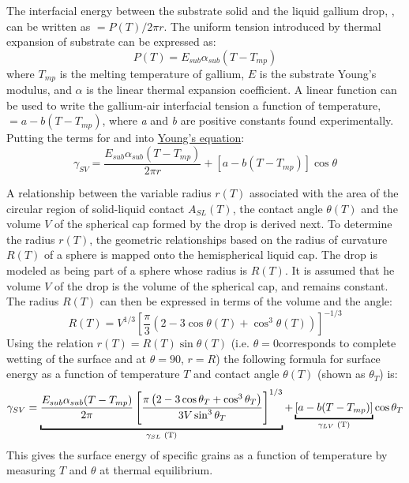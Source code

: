 The interfacial energy between the substrate solid and the liquid gallium drop, \gamSL, can be written as \gamSL$=P(T)/2\pi r$. The uniform tension introduced by thermal expansion of substrate can be expressed as:
\begin{equation}\label{uniform-tension}
	P(T) = E_{sub}\alpha_{sub}(T-T_{mp})
\end{equation}
where $T_{mp}$ is the melting temperature of gallium, $E$  is the substrate Young’s modulus, and $\alpha$ is the linear thermal expansion coefficient. A linear function can be used to write the gallium-air interfacial tension a function of temperature, \gamLV $= a-b(T-T_{mp})$, where \textit{a} and \textit{b} are positive constants found experimentally.\cite{Hardy1985,Alchagirov2005} Putting the terms for \gamSL and \gamSV into \hyperlink{youngeqn}{Young’s equation}\cite{Rudawska2009,Tadmor2004}:
\begin{equation*}%
	\gamma_{SV} =  \frac{E_{sub}\alpha_{sub}(T-T_{mp})}{2\pi r} + \left[a-b(T-T_{mp})\right]\cos\theta
\end{equation*}


A relationship between the variable radius $r(T)$ associated with the area of the circular region of solid-liquid contact $A_{SL}(T)$, the contact angle $\theta(T)$ and the volume $V$ of the spherical cap formed by the drop is derived next. To determine the radius $r(T)$, the geometric relationships based on the radius of curvature $R(T)$ of a sphere is mapped onto the hemispherical liquid cap. The drop is modeled as being part of a sphere whose radius is $R(T)$. It is assumed that he volume $V$ of the drop is the volume of the spherical cap, and remains constant. The radius $R(T)$ can then be expressed in terms of the volume and the angle:
\begin{equation*}\label{drop-geom}
	R(T) = V^{1/3} \left[\frac{\pi}{3} \left(2-3\cos\theta(T)+\cos^{3}\theta(T)\right)\right]^{-1/3}
\end{equation*}
Using the relation $r(T)=R(T)\sin\theta(T)$ (i.e. $\theta=$0\degree corresponds to complete wetting of the surface and at $\theta=90$\degree,  $r=R$) the following formula for surface energy as a function of temperature $T$ and contact angle $\theta(T)$ (shown as $\theta_{T}$) is:
\begin{equation}\label{youngs-eqn-ga}
	\gamma_{SV} =  \underbracket{\frac{E_{sub}\alpha_{sub}(T-T_{mp})}{2\pi}\left[\frac{\pi\left(2-3\cos\theta_{T}+\cos^{3}\theta_{T}\right)}{3V\sin^{3}\theta_{T}} \right]^{1/3}}_{\text{\gamSL(T)}} + \underbracket{\left[a-b(T-T_{mp})\right]}_{\text{\gamLV(T)}} \cos\theta_{T}
\end{equation}
This gives the surface energy \gamSV of specific grains as a function of temperature by measuring $T$ and $\theta$ at thermal equilibrium.



